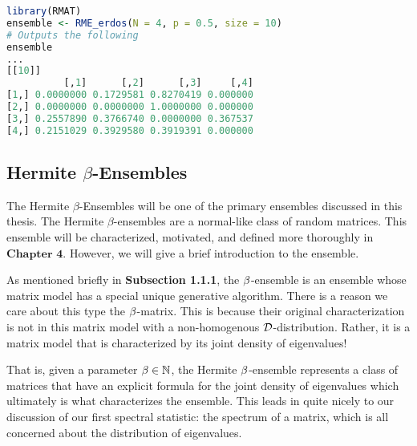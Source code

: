 \begin{lstlisting}[language=R]
library(RMAT)
ensemble <- RME_erdos(N = 4, p = 0.5, size = 10)
# Outputs the following
ensemble
...
[[10]]
          [,1]      [,2]      [,3]     [,4]
[1,] 0.0000000 0.1729581 0.8270419 0.000000
[2,] 0.0000000 0.0000000 1.0000000 0.000000
[3,] 0.2557890 0.3766740 0.0000000 0.367537
[4,] 0.2151029 0.3929580 0.3919391 0.000000
\end{lstlisting}


\subsection{Hermite $\beta$-Ensembles}

The Hermite $\beta$-Ensembles will be one of the primary ensembles discussed in this thesis. The Hermite $\beta$-ensembles are a normal-like class of random matrices.
This ensemble will be characterized, motivated, and defined more thoroughly in $\textbf{Chapter 4}$. However, we will give a brief introduction to the ensemble.

As mentioned briefly in \textbf{Subsection 1.1.1}, the $\beta$-ensemble is an ensemble whose matrix model has a special unique generative algorithm. There is a reason we
care about this type the $\beta$-matrix. This is because their original characterization is not in this matrix model with a non-homogenous $\mathcal{D}$-distribution. Rather, it is
a matrix model that is characterized by its joint density of eigenvalues!

That is, given a parameter $\beta \in \mathbb{N}$, the Hermite $\beta$-ensemble represents a class of matrices that have an explicit formula for the joint density of eigenvalues which
ultimately is what characterizes the ensemble. This leads in quite nicely to our discussion of our first spectral statistic: the spectrum of a matrix, which is all concerned
about the distribution of eigenvalues.



\begin{center}
  \Ddisttable
\end{center}

